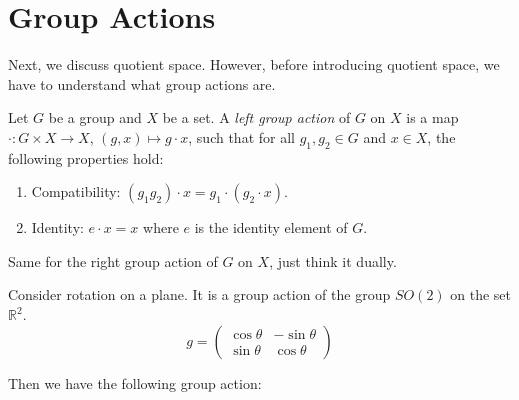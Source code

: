 \documentclass[
	11pt, %
	fleqn, %
	a4paper, %
]{LegrandOrangeBook}
\newcommand{\R}{\mathbb{R}} %
\begin{document}
\newpage

\section{Group Actions}

Next, we discuss quotient space. However, before introducing quotient space, we have to understand what group actions are. 

\begin{definition}
    Let $G$ be a group and $X$ be a set. A \emph{left group action} of $G$ on $X$ is a map $\cdot : G \times X \to X$, $(g, x) \mapsto g \cdot x$, such that for all $g_1, g_2 \in G$ and $x \in X$, the following properties hold:
    \begin{enumerate}
        \item Compatibility: $(g_1 g_2) \cdot x = g_1 \cdot (g_2 \cdot x)$.
        \item Identity: $e \cdot x = x$ where $e$ is the identity element of $G$.
    \end{enumerate}
\end{definition}

Same for the right group action of $G$ on $X$, just think it dually.

Consider rotation on a plane. It is a group action of the group $SO(2)$ on the set $\R^2$.
\[
    g = \begin{pmatrix}
        \cos{\theta} & -\sin{\theta} \\
        \sin{\theta} & \cos{\theta}
    \end{pmatrix}
\]

Then we have the following group action:
\begin{center}
\end{center}
\end{document}
